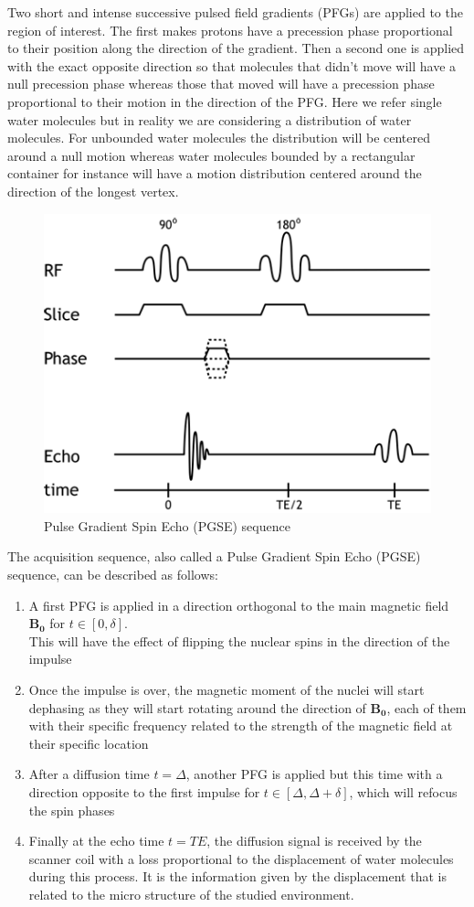 Two short and intense successive pulsed field gradients (PFGs) are applied to the region of interest. The first makes protons have a precession phase proportional to their position along the direction of the gradient. Then a second one is applied with the exact opposite direction so that molecules that didn't move will have a null precession phase whereas those that moved will have a precession phase proportional to their motion in the direction of the PFG. Here we refer single water molecules but in reality we are considering a distribution of water molecules. For unbounded water molecules the distribution will be centered around a null motion whereas water molecules bounded by a rectangular container for instance will have a motion distribution centered around the direction of the longest vertex.
\begin{figure}
    \centering
    \includegraphics[width=.5\textwidth]{figures/pgse}
    \caption{Pulse Gradient Spin Echo (PGSE) sequence}
    \label{fig:pgse}
\end{figure}

The acquisition sequence, also called a Pulse Gradient Spin Echo (PGSE) sequence, can be described as follows: \cite{assemlal2011recent}
\begin{enumerate}
    \item A first PFG is applied in a direction orthogonal to the main magnetic field $\mathbf{B_0}$ for $t \in [0, \delta]$.\\
    This will have the effect of flipping the nuclear spins in the direction of the impulse
    \item Once the impulse is over, the magnetic moment of the nuclei will start dephasing as they will start rotating around the direction of $\mathbf{B_0}$, each of them with their specific frequency related to the strength of the magnetic field at their specific location
    \item After a diffusion time $t = \Delta$, another PFG is applied but this time with a direction opposite to the first impulse for $t \in [\Delta, \Delta + \delta]$, which will refocus the spin phases
    \item Finally at the echo time $t = TE$, the diffusion signal is received by the scanner coil with a loss proportional to the displacement of water molecules during this process. It is the information given by the displacement that is related to the micro structure of the studied environment.
\end{enumerate}

